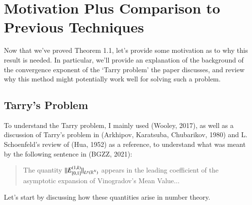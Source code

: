 

\renewcommand\thesection{}



\chapter*{Motivation Plus Comparison to Previous Techniques}

	Now that we've proved Theorem 1.1, let's provide some motivation as to why this result is needed. In particular, we'll provide an explanation of the background of the convergence exponent of the `Tarry problem' the paper discusses, and review why this method might potentially work well for solving such a problem.

	\section{Tarry's Problem}

	To understand the Tarry problem, I mainly used (Wooley, 2017), as well as a discussion of Tarry's problem in (Arkhipov, Karatsuba, Chubarikov, 1980) and L. Schoenfeld's review of (Hua, 1952) as a reference, to understand what was meant by the following sentence in (BGZZ, 2021):
	\begin{quote}
		The quantity $\| E_{[0,1]}^{(1,k)} \|_{L^p(\operatorname{\mathbb{R}}^N)}$ appears in the leading coefficient of the asymptotic expansion of Vinogradov's Mean Value$\dots$
	\end{quote}
	Let's start by discussing how these quantities arise in number theory.


